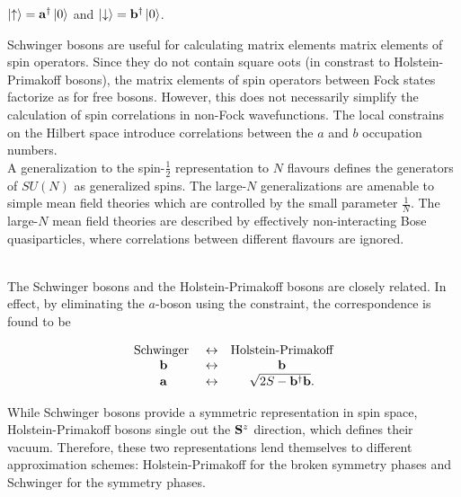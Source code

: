 \documentclass{homework}
\begin{document}
$\ket{\uparrow} = {\bf a}^\dagger \ket{0}$ and $\ket{\downarrow} = {\bf b}^\dagger \ket{0}$. 

\begin{tcolorbox}[colback=my-blue, title = Physical Context]

Schwinger bosons are useful for calculating matrix elements matrix elements of spin operators. Since they do not contain square oots (in constrast to Holstein-Primakoff bosons), the matrix elements of spin operators between Fock states factorize as for free bosons. However, this does not necessarily simplify the calculation of spin correlations in non-Fock wavefunctions. The local constrains on the Hilbert space introduce correlations between the $a$ and $b$ occupation numbers. \\

A generalization to the spin-$\frac{1}{2}$ representation to $N$ flavours defines the generators of $SU(N)$ as generalized spins. The large-$N$ generalizations are amenable to simple mean field theories which are controlled by the small parameter $\frac{1}{N}$. The large-$N$ mean field theories are described by effectively non-interacting Bose quasiparticles, where correlations between different flavours are ignored.

\end{tcolorbox}

\blanky\\

The Schwinger bosons and the Holstein-Primakoff bosons are closely related. In effect, by eliminating the $a$-boson using the constraint, the correspondence is found to be 

\begin{equation}
    \begin{array}{ccc}
         \textnormal{Schwinger } & \leftrightarrow & \textnormal{Holstein-Primakoff} \\
         {\bf b} & \leftrightarrow & {\bf b}\\
         {\bf a} & \leftrightarrow & \sqrt{2S - {\bf b}^\dagger {\bf b}}.
    \end{array}
\end{equation}

While Schwinger bosons provide a symmetric representation in spin space, Holstein-Primakoff bosons single out the ${\bf S}^z$ direction, which defines their vacuum. Therefore, these two representations lend themselves to different approximation schemes: Holstein-Primakoff for the broken symmetry phases and Schwinger for the symmetry phases. \\
\end{document}
